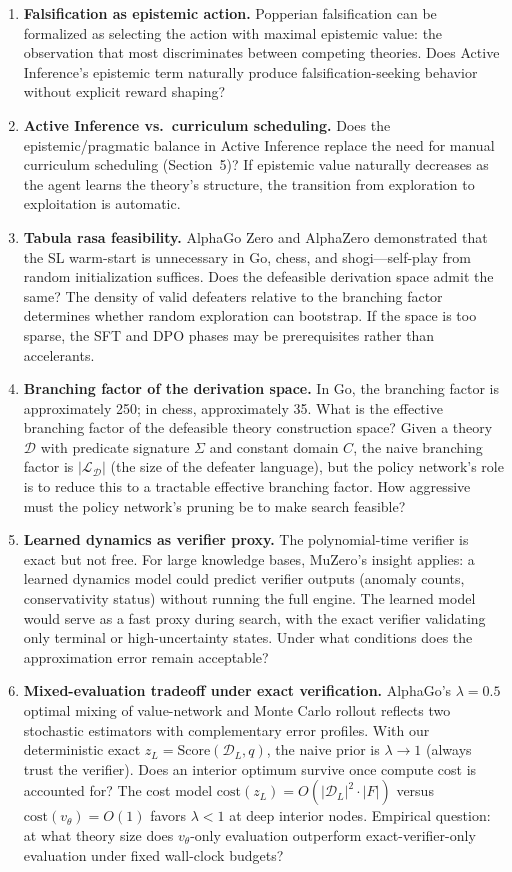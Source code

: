 \documentclass{article}
\newcommand{\D}{\mathcal{D}}
\newcommand{\Score}{\mathrm{Score}}
\begin{document}
\begin{enumerate}
    \item \textbf{Falsification as epistemic action.} Popperian falsification can be formalized as selecting the action with maximal epistemic value: the observation that most discriminates between competing theories. Does Active Inference's epistemic term naturally produce falsification-seeking behavior without explicit reward shaping?
    \item \textbf{Active Inference vs.\ curriculum scheduling.} Does the epistemic/pragmatic balance in Active Inference replace the need for manual curriculum scheduling (Section~5)? If epistemic value naturally decreases as the agent learns the theory's structure, the transition from exploration to exploitation is automatic.
    \item \textbf{Tabula rasa feasibility.} AlphaGo Zero and AlphaZero demonstrated that the SL warm-start is unnecessary in Go, chess, and shogi---self-play from random initialization suffices. Does the defeasible derivation space admit the same? The density of valid defeaters relative to the branching factor determines whether random exploration can bootstrap. If the space is too sparse, the SFT and DPO phases may be prerequisites rather than accelerants.
    \item \textbf{Branching factor of the derivation space.} In Go, the branching factor is approximately 250; in chess, approximately 35. What is the effective branching factor of the defeasible theory construction space? Given a theory $\D$ with predicate signature $\Sigma$ and constant domain $C$, the naive branching factor is $|\mathcal{L}_\D|$ (the size of the defeater language), but the policy network's role is to reduce this to a tractable effective branching factor. How aggressive must the policy network's pruning be to make search feasible?
    \item \textbf{Learned dynamics as verifier proxy.} The polynomial-time verifier is exact but not free. For large knowledge bases, MuZero's insight applies: a learned dynamics model could predict verifier outputs (anomaly counts, conservativity status) without running the full engine. The learned model would serve as a fast proxy during search, with the exact verifier validating only terminal or high-uncertainty states. Under what conditions does the approximation error remain acceptable?
    \item \textbf{Mixed-evaluation tradeoff under exact verification.} AlphaGo's $\lambda = 0.5$ optimal mixing of value-network and Monte Carlo rollout reflects two stochastic estimators with complementary error profiles. With our deterministic exact $z_L = \Score(\D_L, q)$, the naive prior is $\lambda \to 1$ (always trust the verifier). Does an interior optimum survive once compute cost is accounted for? The cost model $\mathrm{cost}(z_L) = O(|\D_L|^2 \cdot |F|)$ versus $\mathrm{cost}(v_\theta) = O(1)$ favors $\lambda < 1$ at deep interior nodes. Empirical question: at what theory size does $v_\theta$-only evaluation outperform exact-verifier-only evaluation under fixed wall-clock budgets?

\end{enumerate}
\end{document}
